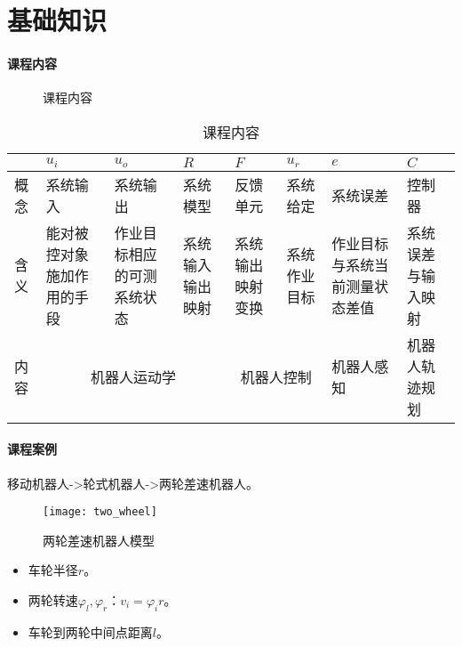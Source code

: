 \documentclass[
12pt, %
a4paper, 
oneside, %
headinclude,footinclude, %
]{scrartcl}
\title{\normalfont\spacedallcaps{智能工程}}
\date{}
\begin{document}
\maketitle
\newpage
\tableofcontents 
\newpage
\listoffigures
\listoftables
\listoftips
\newpage
\section{基础知识}
\paragraph{课程内容}
\begin{figure}[H]
\centering
{} \quad
{}
\caption[课程内容]{课程内容}
\end{figure}

\begin{table}[hbt]
\caption{课程内容}
\centering
\begin{tabular}{|p{0.5cm}|p{2cm}|p{2cm}|p{2cm}|p{2cm}|p{2cm}|p{2cm}|p{2cm}|}
\hline
& $ u_i $ & $ u_o $ & $ R $ & $ F $ & $ u_r $ & $ e $ & $ C $ \\
\hline
概念 & 系统输入 & 系统输出 & 系统模型 & 反馈单元 & 系统给定 & 系统误差 & 控制器 \\
\hline
含义 & 能对被控对象施加作用的手段 & 作业目标相应的可测系统状态 & 系统输入输出映射 & 系统输出映射变换 & 系统作业目标 & 作业目标与系统当前测量状态差值 & 系统误差与输入映射 \\
\hline
内容 & \multicolumn{3}{c|}{机器人运动学} & \multicolumn{2}{c|}{机器人控制} & 机器人感知 & 机器人轨迹规划 \\
\hline
\end{tabular}
\end{table}
\paragraph{课程案例}\label{sec:two_wheel}
移动机器人->轮式机器人->两轮差速机器人。
\begin{figure}[H]
\centering 
\texttt{[image: two\_wheel]} 
\caption[两轮差速机器人模型]{两轮差速机器人模型}
\end{figure}
\begin{itemize}
\item 车轮半径$ r $。
\item 两轮转速$ \varphi_l,\varphi_r $：$ v_i = \varphi_i r $。
\item 车轮到两轮中间点距离$ l $。
\end{itemize}
\end{document}
